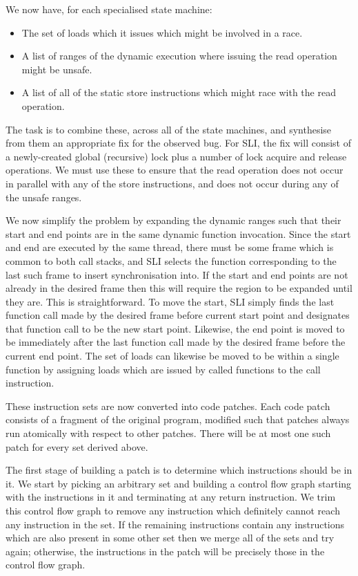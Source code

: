 \documentclass[10pt,twocolumn,preprint,natbib,authoryear]{sigplanconf}
\begin{document}
We now have, for each specialised state machine:

\begin{itemize}
\item The set of loads which it issues which might be involved in a
  race.
\item A list of ranges of the dynamic execution where issuing the
  read operation might be unsafe.
\item A list of all of the static store instructions which might race with
  the read operation.
\end{itemize}

The task is to combine these, across all of the state machines, and
synthesise from them an appropriate fix for the observed bug.  For
SLI, the fix will consist of a newly-created global (recursive) lock
plus a number of lock acquire and release operations.  We must use
these to ensure that the read operation does not occur in parallel
with any of the store instructions, and does not occur during any of
the unsafe ranges.

We now simplify the problem by expanding the dynamic ranges such that
their start and end points are in the same dynamic function
invocation.  Since the start and end are executed by the same thread,
there must be some frame which is common to both call stacks, and SLI
selects the function corresponding to the last such frame to insert
synchronisation into.  If the start and end points are not already in
the desired frame then this will require the region to be expanded
until they are.  This is straightforward.  To move the start, SLI
simply finds the last function call made by the desired frame before
current start point and designates that function call to be the new
start point.  Likewise, the end point is moved to be immediately after
the last function call made by the desired frame before the current
end point.  The set of loads can likewise be moved to be within a
single function by assigning loads which are issued by called
functions to the call instruction.

These instruction sets are now converted into code patches.  Each code
patch consists of a fragment of the original program, modified such
that patches always run atomically with respect to other patches.
There will be at most one such patch for every set derived above.

The first stage of building a patch is to determine which instructions
should be in it.  We start by picking an arbitrary set and building a
control flow graph starting with the instructions in it and
terminating at any return instruction.  We trim this control flow
graph to remove any instruction which definitely cannot reach any
instruction in the set.  If the remaining instructions contain any
instructions which are also present in some other set then we merge
all of the sets and try again; otherwise, the instructions in the
patch will be precisely those in the control flow graph.
\end{document}
